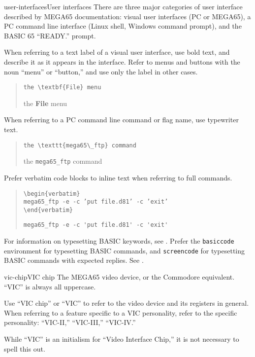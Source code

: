 \begin{sgentry}{user-interfaces}{User interfaces}
    There are three major categories of user interface described by MEGA65 documentation: visual user interfaces (PC or MEGA65), a PC command line interface (Linux shell, Windows command prompt), and the BASIC 65 ``READY.'' prompt.

    When referring to a text label of a visual user interface, use bold text, and describe it as it appears in the interface. Refer to menus and buttons with the noun ``menu'' or ``button,'' and use only the label in other cases.

    \begin{quote}
        \texttt{the {\textbackslash}textbf\{File\} menu}

        \hrulefill

        the \textbf{File} menu
    \end{quote}

    When referring to a PC command line command or flag name, use typewriter text.

    \begin{quote}
        \texttt{the {\textbackslash}texttt\{mega65{\textbackslash}\_ftp\} command}

        \hrulefill

        the \texttt{mega65\_ftp} command
    \end{quote}

    Prefer verbatim code blocks to inline text when referring to full commands.

    \begin{quote}
        \texttt{{\textbackslash}begin\{verbatim\} \\
        mega65\_ftp -e -c 'put file.d81' -c 'exit' \\
        {\textbackslash}end\{verbatim\}}

        \hrulefill

\begin{verbatim}
mega65_ftp -e -c 'put file.d81' -c 'exit'
\end{verbatim}
    \end{quote}

    For information on typesetting BASIC keywords, see . Prefer the \texttt{basiccode} environment for typesetting BASIC commands, and \texttt{screencode} for typesetting BASIC commands with expected replies. See .
\end{sgentry}

\begin{sgentry}{vic-chip}{VIC chip}
    The MEGA65 video device, or the Commodore equivalent. ``VIC'' is always all uppercase.

    Use ``VIC chip'' or ``VIC'' to refer to the video device and its registers in general. When referring to a feature specific to a VIC personality, refer to the specific personality: ``VIC-II,'' ``VIC-III,'' ``VIC-IV.''

    While ``VIC'' is an initialism for ``Video Interface Chip,'' it is not necessary to spell this out.
\end{sgentry}

